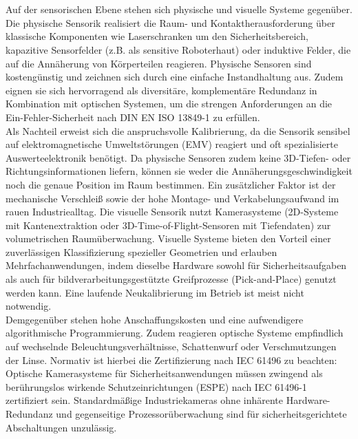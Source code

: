 \\
\\Auf der sensorischen Ebene stehen sich physische und visuelle Systeme gegenüber. Die physische Sensorik realisiert die Raum- und Kontaktherausforderung über klassische Komponenten wie Laserschranken um den Sicherheitsbereich, kapazitive Sensorfelder (z.B. als sensitive Roboterhaut) oder induktive Felder, die auf die Annäherung von Körperteilen reagieren. Physische Sensoren sind kostengünstig und zeichnen sich durch eine einfache Instandhaltung aus. Zudem eignen sie sich hervorragend als diversitäre, komplementäre Redundanz in Kombination mit optischen Systemen, um die strengen Anforderungen an die Ein-Fehler-Sicherheit nach DIN EN ISO 13849-1 \cite{din13849_1_2023} zu erfüllen. 
\\Als Nachteil erweist sich die anspruchsvolle Kalibrierung, da die Sensorik sensibel auf elektromagnetische Umweltstörungen (EMV) reagiert und oft spezialisierte Auswerteelektronik benötigt. Da physische Sensoren zudem keine 3D-Tiefen- oder Richtungsinformationen liefern, können sie weder die Annäherungsgeschwindigkeit noch die genaue Position im Raum bestimmen. Ein zusätzlicher Faktor ist der mechanische Verschleiß sowie der hohe Montage- und Verkabelungsaufwand im rauen Industriealltag. Die visuelle Sensorik nutzt Kamerasysteme (2D-Systeme mit Kantenextraktion oder 3D-Time-of-Flight-Sensoren mit Tiefendaten) zur volumetrischen Raumüberwachung. Visuelle Systeme bieten den Vorteil einer zuverlässigen Klassifizierung spezieller Geometrien und erlauben Mehrfachanwendungen, indem dieselbe Hardware sowohl für Sicherheitsaufgaben als auch für bildverarbeitungsgestützte Greifprozesse (Pick-and-Place) genutzt werden kann. Eine laufende Neukalibrierung im Betrieb ist meist nicht notwendig. 
\\Demgegenüber stehen hohe Anschaffungskosten und eine aufwendigere algorithmische Programmierung. Zudem reagieren optische Systeme empfindlich auf wechselnde Beleuchtungsverhältnisse, Schattenwurf oder Verschmutzungen der Linse. Normativ ist hierbei die Zertifizierung nach IEC 61496 zu beachten: Optische Kamerasysteme für Sicherheitsanwendungen müssen zwingend als berührungslos wirkende Schutzeinrichtungen (ESPE) nach IEC 61496-1 zertifiziert sein. Standardmäßige Industriekameras ohne inhärente Hardware-Redundanz und gegenseitige Prozessorüberwachung sind für sicherheitsgerichtete Abschaltungen unzulässig. 
\\

